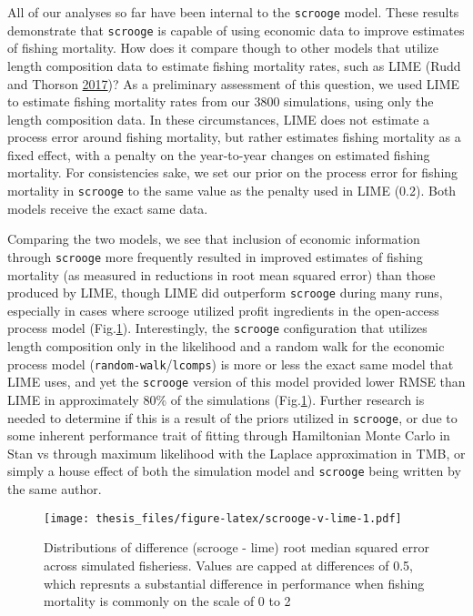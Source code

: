 \documentclass[twoside,12pt,final]{ucthesis-CA2012}
\begin{document}
\begin{ucmainmatter}
All of our analyses so far have been internal to the \texttt{scrooge}
model. These results demonstrate that \texttt{scrooge} is capable of
using economic data to improve estimates of fishing mortality. How does
it compare though to other models that utilize length composition data
to estimate fishing mortality rates, such as LIME (Rudd and Thorson
\protect\hyperlink{ref-Rudd2017}{2017})? As a preliminary assessment of
this question, we used LIME to estimate fishing mortality rates from our
3800 simulations, using only the length composition data. In these
circumstances, LIME does not estimate a process error around fishing
mortality, but rather estimates fishing mortality as a fixed effect,
with a penalty on the year-to-year changes on estimated fishing
mortality. For consistencies sake, we set our prior on the process error
for fishing mortality in \texttt{scrooge} to the same value as the
penalty used in LIME (0.2). Both models receive the exact same data.

Comparing the two models, we see that inclusion of economic information
through \texttt{scrooge} more frequently resulted in improved estimates
of fishing mortality (as measured in reductions in root mean squared
error) than those produced by LIME, though LIME did outperform
\texttt{scrooge} during many runs, especially in cases where scrooge
utilized profit ingredients in the open-access process model
(Fig.\ref{fig:scrooge-v-lime}). Interestingly, the \texttt{scrooge}
configuration that utilizes length composition only in the likelihood
and a random walk for the economic process model
(\texttt{random-walk}/\texttt{lcomps}) is more or less the exact same
model that LIME uses, and yet the \texttt{scrooge} version of this model
provided lower RMSE than LIME in approximately 80\% of the simulations
(Fig.\ref{fig:scrooge-v-lime}). Further research is needed to determine
if this is a result of the priors utilized in \texttt{scrooge}, or due
to some inherent performance trait of fitting through Hamiltonian Monte
Carlo in Stan vs through maximum likelihood with the Laplace
approximation in TMB, or simply a house effect of both the simulation
model and \texttt{scrooge} being written by the same author.
\begin{figure}
\centering
\texttt{[image: thesis\_files/figure-latex/scrooge-v-lime-1.pdf]}
\caption{\label{fig:scrooge-v-lime}Distributions of difference (scrooge -
lime) root median squared error across simulated fisheriess. Values are
capped at differences of \textbar{}0.5\textbar{}, which represnts a
substantial difference in performance when fishing mortality is commonly
on the scale of 0 to 2}
\end{figure}

\end{ucmainmatter}
\end{document}
